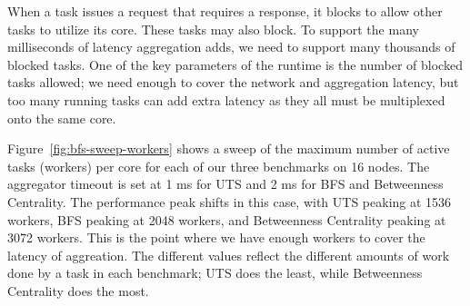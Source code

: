 {When a task issues a request that requires a response, it blocks to
allow other tasks to utilize its core. These tasks may also block. To
support the many milliseconds of latency aggregation adds, we need to
support many thousands of blocked tasks. One of the key parameters of
the runtime is the number of blocked tasks allowed; we need enough to
cover the network and aggregation latency, but too many running tasks
can add extra latency as they all must be multiplexed onto the same core.

Figure~\ref{fig:bfs-sweep-workers} shows a sweep of the maximum number
of active tasks (workers) per core for each of our three benchmarks on
16 nodes. The aggregator timeout is set at 1 ms for UTS and 2 ms for
BFS and Betweenness Centrality. The performance peak shifts in this
case, with UTS peaking at 1536 workers, BFS peaking at 2048 workers,
and Betweenness Centrality peaking at 3072 workers. This is the point
where we have enough workers to cover the latency of aggreation. The
different values reflect the different amounts of work done by a task
in each benchmark; UTS does the least, while Betweenness Centrality does the most.

%
%
%


}
